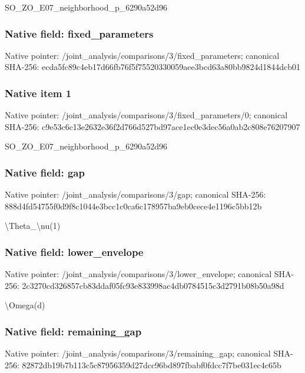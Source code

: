 \documentclass[10pt,a4paper]{article}
\begin{document}
\begingroup\raggedright\sloppy SO\_\allowbreak{}ZO\_\allowbreak{}E07\_\allowbreak{}neighborhood\_\allowbreak{}p\_\allowbreak{}6290a52d96\par\endgroup

\subsubsection{Native field: fixed\_\allowbreak{}parameters}
Native pointer: /joint\_\allowbreak{}analysis/comparisons/3/fixed\_\allowbreak{}parameters; canonical SHA-256: ecda5fc89c4eb17d66fb76f5f75520330059aee3bcd63a80bb9824d1844dcb01

\subsubsection{Native item 1}
Native pointer: /joint\_\allowbreak{}analysis/comparisons/3/fixed\_\allowbreak{}parameters/0; canonical SHA-256: c9e53c6c13e2632e36f2d766d527bd97ace1ec0e3dec56a0ab2c808e76207907

\begingroup\raggedright\sloppy SO\_\allowbreak{}ZO\_\allowbreak{}E07\_\allowbreak{}neighborhood\_\allowbreak{}p\_\allowbreak{}6290a52d96\par\endgroup

\subsubsection{Native field: gap}
Native pointer: /joint\_\allowbreak{}analysis/comparisons/3/gap; canonical SHA-256: 888d4fd54755f0d9f8c1044e3bcc1c0ca6c178957ba9eb0cece4e1196c5bb12b

\begingroup\raggedright\sloppy \textbackslash{}Theta\_\allowbreak{}\textbackslash{}nu(1)\par\endgroup

\subsubsection{Native field: lower\_\allowbreak{}envelope}
Native pointer: /joint\_\allowbreak{}analysis/comparisons/3/lower\_\allowbreak{}envelope; canonical SHA-256: 2c3270cd326857cb83ddaf05fc93e833998ac4db0784515c3d2791b08b50a98d

\begingroup\raggedright\sloppy \textbackslash{}Omega(d)\par\endgroup

\subsubsection{Native field: remaining\_\allowbreak{}gap}
Native pointer: /joint\_\allowbreak{}analysis/comparisons/3/remaining\_\allowbreak{}gap; canonical SHA-256: 82872db19b7b113c5c87956359d27dcc96bd897fbabf0fdcc7f7be031ec4c65b
\end{document}
